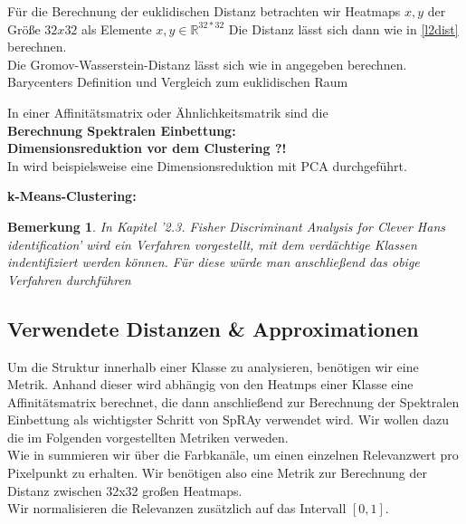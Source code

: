 \documentclass[twoside, 12pt,a4paper]{article}
\newtheorem{remark}[theorem]{Bemerkung}
\numberwithin{equation}{section}
\begin{document}
	Für die Berechnung der euklidischen Distanz betrachten wir Heatmaps $x,y$ der Größe $32x32$ als Elemente $x,y \in \mathbb{R}^{32*32}$ Die Distanz lässt sich dann wie in \autoref{l2dist} berechnen.\\
	
	Die Gromov-Wasserstein-Distanz lässt sich wie in \cite{gwd_averaging_kernels} angegeben berechnen. \\
	
	Barycenters Definition und Vergleich zum euklidischen Raum \cite{bary_wasserstein_space}
	
	In einer Affinitätsmatrix oder Ähnlichkeitsmatrik sind die \\
	
	\noindent \textbf{Berechnung Spektralen Einbettung:}\\
	
	\noindent \textbf{Dimensionsreduktion vor dem Clustering ?!}\\
	
	In \cite{AC} wird beispielsweise eine Dimensionsreduktion mit PCA durchgeführt.
	
	\noindent \textbf{k-Means-Clustering:}\\
	\begin{remark}
		In \cite{imagenet_unhansed_v1} Kapitel '2.3. Fisher Discriminant Analysis for Clever Hans
		identification' wird ein Verfahren vorgestellt, mit dem verdächtige Klassen indentifiziert werden können. Für diese würde man anschließend das obige Verfahren durchführen
	\end{remark}
	\subsection{Verwendete Distanzen \& Approximationen}
	
	Um die Struktur innerhalb einer Klasse zu analysieren, benötigen wir eine Metrik.
	Anhand dieser wird abhängig von den Heatmps einer Klasse eine Affinitätsmatrix berechnet, die dann anschließend zur Berechnung der Spektralen Einbettung als wichtigster Schritt von SpRAy verwendet wird. Wir wollen dazu die im Folgenden vorgestellten Metriken verweden.\\
	Wie in \cite{imagenet_unhansed_v1} summieren wir über die Farbkanäle, um einen einzelnen Relevanzwert pro Pixelpunkt zu erhalten. Wir benötigen also eine Metrik zur Berechnung der Distanz zwischen 32x32 großen Heatmaps.\\
	Wir normalisieren die Relevanzen zusätzlich auf das Intervall $[0,1]$.
	
\end{document}
